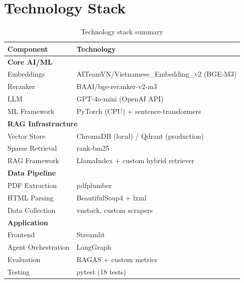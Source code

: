 \documentclass[12pt,a4paper]{article}
\begin{document}
\section{Technology Stack}
\label{sec:techstack}

\begin{table}[H]
\centering
\caption{Technology stack summary}
\label{tab:techstack}
\begin{tabular}{ll}
\toprule
\textbf{Component} & \textbf{Technology} \\
\midrule
\multicolumn{2}{l}{\textbf{Core AI/ML}} \\
\quad Embeddings & AITeamVN/Vietnamese\_Embedding\_v2 (BGE-M3) \\
\quad Reranker & BAAI/bge-reranker-v2-m3 \\
\quad LLM & GPT-4o-mini (OpenAI API) \\
\quad ML Framework & PyTorch (CPU) + sentence-transformers \\
\midrule
\multicolumn{2}{l}{\textbf{RAG Infrastructure}} \\
\quad Vector Store & ChromaDB (local) / Qdrant (production) \\
\quad Sparse Retrieval & rank-bm25 \\
\quad RAG Framework & LlamaIndex + custom hybrid retriever \\
\midrule
\multicolumn{2}{l}{\textbf{Data Pipeline}} \\
\quad PDF Extraction & pdfplumber \\
\quad HTML Parsing & BeautifulSoup4 + lxml \\
\quad Data Collection & vnstock, custom scrapers \\
\midrule
\multicolumn{2}{l}{\textbf{Application}} \\
\quad Frontend & Streamlit \\
\quad Agent Orchestration & LangGraph \\
\quad Evaluation & RAGAS + custom metrics \\
\quad Testing & pytest (18 tests) \\
\bottomrule
\end{tabular}
\end{table}

\end{document}
